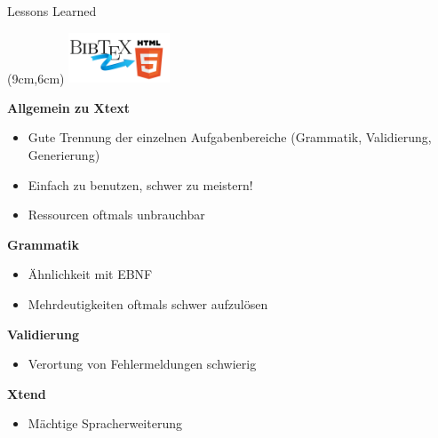 \documentclass[fleqn,11pt,aspectratio=43]{beamer}
\begin{document}
\begin{frame}{Lessons Learned}
\begin{textblock*}{3cm}(9cm,6cm) %
\includegraphics[width=3cm]{../logo.png}
\end{textblock*}
\textbf{Allgemein zu Xtext}
\begin{itemize}
\item Gute Trennung der einzelnen Aufgabenbereiche (Grammatik, Validierung, Generierung)
\item Einfach zu benutzen, schwer zu meistern!
\item Ressourcen oftmals unbrauchbar
\end{itemize}

\textbf{Grammatik}
\begin{itemize}
\item Ähnlichkeit mit EBNF
\item Mehrdeutigkeiten oftmals schwer aufzulösen
\end{itemize}

\textbf{Validierung}
\begin{itemize}
\item Verortung von Fehlermeldungen schwierig
\end{itemize}

\textbf{Xtend}
\begin{itemize}
\item Mächtige Spracherweiterung
\end{itemize}

\end{frame}
\end{document}
